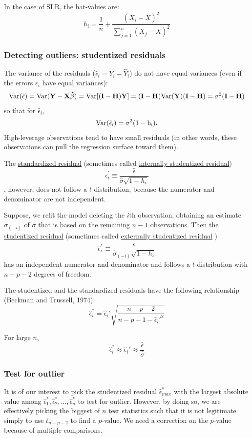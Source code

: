In the case of SLR, the hat-values are:
$$
h_i = \frac{1}{n} + \frac{(X_i - \bar{X})^2}{\sum_{j = 1}^n (X_j - \bar{X})^2}
$$

\subsubsection*{Detecting outliers: studentized residuals}
The variance of the residuals ($\hat{\epsilon}_i = Y_i - \hat{Y}_i$) do not have equal variances (even if the errors $\epsilon_i$ have equal variances):
$$
\rm Var(\hat{\epsilon}) = \rm Var(\mathbf{Y - X\hat{\beta}})  = \rm Var[(\mathbf{I - H})\mathbf{Y}]= (\mathbf{I - H}) \rm Var(\mathbf{Y})(\mathbf{I - H}) = \sigma^2 (\mathbf{I - H})
$$
so that for $\hat{\epsilon}_i$,
$$
\rm Var(\hat{\epsilon}_i) = \sigma^2 (1 - h_i).
$$
High-leverage observations tend to have small residuals (in other words, these observations can pull the regression surface toward them).

The \underline{standardized residual} (sometimes called \underline{internally studentized residual})
$$
\hat{\epsilon}_i^{'} \equiv \frac{\hat{\epsilon}}{\hat{\sigma}\sqrt{1 - h_i}}
$$
, however, does not follow a $t$-distribution, because the numerator and denominator are not independent.

Suppose, we refit the model deleting the $i$th observation, obtaining an estimate $\hat{\sigma}_{(-i)}$ of $\sigma$ that is based on the remaining $n-1$ observations.
Then the \underline{studentized residual} (sometimes called \underline{externally studentized residual} )
$$
\hat{\epsilon}_i^{*}  \equiv \frac{\hat{\epsilon}}{\hat{\sigma}_{(-i)} \sqrt{1 - h_i}}
$$
has an independent numerator and denominator and follows a $t$-distribution with $n-p-2$ degrees of freedom.

The studentized and the standardized residuals have the following relationship (Beckman and Trussell, 1974):
$$
\hat{\epsilon}_i^{*} = \hat{\epsilon}_i' \sqrt{ \frac{n - p -2}{n - p - 1 - \hat{\epsilon}_i'^{2}}}
$$

For large $n$,
$$
\hat{\epsilon}_i^{*} \approx \hat{\epsilon}_i' \approx \frac{\hat{\epsilon}}{\hat{\sigma}}
$$

\subsubsection*{Test for outlier}
It is of our interest to pick the studentized residual $\hat{\epsilon}_{max}^{*}$ with the largest absolute value among $\hat{\epsilon}_1^{*}, \hat{\epsilon}_2^{*}, \dots, \hat{\epsilon}_n^{*}$ to test for outlier.
However, by doing so, we are effectively picking the biggest of $n$ test statistics such that it is not legitimate simply to use $t_{n - p - 2}$ to find a $p$-value.
We need a correction on the $p$-value because of multiple-comparisons.

